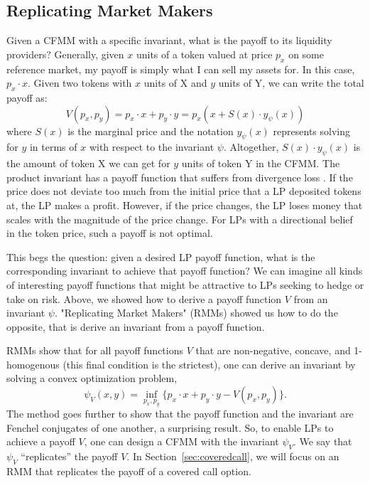 \documentclass[hidelinks, 12pt]{article}
\begin{document}
\subsection{Replicating Market Makers}
\label{sec:rmm}

Given a CFMM with a specific invariant, what is the payoff to its liquidity providers? Generally, given $x$ units of a token valued at price $p_x$ on some reference market, my payoff is simply what I can sell my assets for. In this case,  $p_x \cdot x$. Given two tokens with $x$ units of X and $y$ units of Y, we can write the total payoff as:
\[V(p_x, p_y) = p_x\cdot x + p_y \cdot y = p_x (x + S(x)\cdot y_\psi(x))\]
where $S(x)$ is the marginal price and the notation $y_\psi(x)$ represents solving for $y$ in terms of $x$ with respect to the invariant $\psi$.
Altogether, $S(x)\cdot y_\psi(x)$ is the amount of token X we can get for $y$ units of token Y in the CFMM.
The product invariant has a payoff function that suffers from divergence loss \cite{angeris2019analysis}. If the price does not deviate too much from the initial price that a LP deposited tokens at, the LP makes a profit. However, if the price changes, the LP loses money that scales with the magnitude of the price change. For LPs with a directional belief in the token price, such a payoff is not optimal.

This begs the question: given a desired LP payoff function, what is the corresponding invariant to achieve that payoff function? We can imagine all kinds of interesting payoff functions that might be attractive to LPs seeking to hedge or take on risk.  Above, we showed how to derive a payoff function $V$ from an invariant $\psi$. "Replicating Market Makers" (RMMs) showed us how to do the opposite, that is derive an invariant from a payoff function.

RMMs \cite{angeris2021replicating} show that for all payoff functions $V$ that are non-negative, concave, and 1-homogenous (this final condition is the strictest), one can derive an invariant by solving a convex optimization problem,
\[ \psi_V(x, y) = \inf_{p_x, p_y} \{ p_x \cdot x + p_y \cdot y - V(p_x, p_y) \}. \]
The method goes further to show that the payoff function and the invariant are Fenchel conjugates of one another, a surprising result. So, to enable LPs to achieve a payoff $V$, one can design a CFMM with the invariant $\psi_V$. We say that $\psi_V$ ``replicates'' the payoff $V$. In Section~\ref{sec:coveredcall}, we will focus on an RMM that replicates the payoff of a covered call option.
\end{document}
